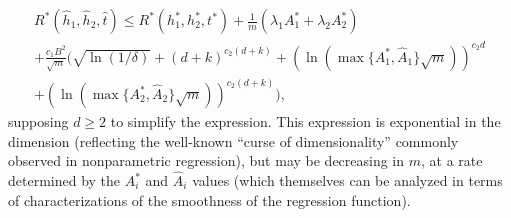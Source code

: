 \documentclass{article}
\newcommand{\eat}[1]{}
\begin{document}
\begin{multline*}
R^{*}(\hat{h}_{1},\hat{h}_{2},\hat{t}) \leq R^{*}(h_{1}^{*},h_{2}^{*},t^{*}) + \frac{1}{m} \left( \lambda_{1} A_{1}^{*} + \lambda_{2} A_{2}^{*} \right)
\\ + \frac{c_{1} B^{2}}{\sqrt{m}} \bigg( 
\sqrt{\ln(1/\delta)} + (d+k)^{c_{2} (d+k)} + (\ln( \max\{A_{1}^{*}, \hat{A}_{1}\} \sqrt{m} ))^{c_{2} d} 
\\+ (\ln( \max\{A_{2}^{*},\hat{A}_{2}\} \sqrt{m} ))^{c_{2}(d+k)} \bigg),
\end{multline*}
supposing $d \geq 2$ to simplify the expression.
This expression is exponential in the dimension (reflecting the well-known ``curse of dimensionality'' 
commonly observed in nonparametric regression), but may be decreasing in $m$,
at a rate determined by the $A_{i}^{*}$ and $\hat{A}_{i}$ values
(which themselves can be analyzed in terms of characterizations of the smoothness of the regression function).

\eat{************** Old stuff
\begin{figure}[t]
  \begin{center}
      \texttt{[image: MWS\_OM.png]}
  \end{center}
  \caption{Above we see the performance of our method compared with
    just using the new or initial features.}
  \label{perf2}
\end{figure}
*****************}
\end{document}
